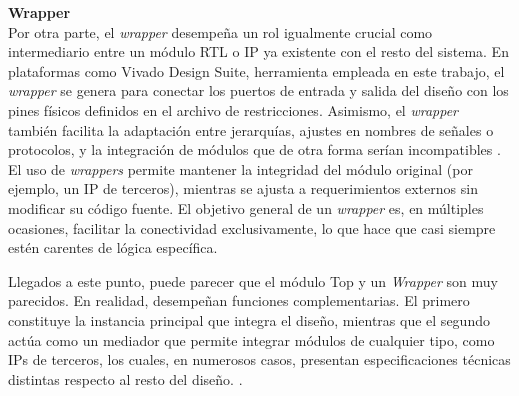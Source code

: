 \vspace{0.4em} %

\begin{adjustwidth}{1.5cm}{}
\textbf{Wrapper} \vspace{0.25cm} \\
Por otra parte, el \textit{wrapper} desempeña un rol igualmente crucial como intermediario entre un módulo RTL o IP ya existente con el resto del sistema. En plataformas como Vivado Design Suite, herramienta empleada en este trabajo, el \textit{wrapper} se genera para conectar los puertos de entrada y salida del diseño con los pines físicos definidos en el archivo de restricciones. Asimismo, el \textit{wrapper} también facilita la adaptación entre jerarquías, ajustes en nombres de señales o protocolos, y la integración de módulos que de otra forma serían incompatibles \cite{infoWrapper}. El uso de \textit{wrappers} permite mantener la integridad del módulo original (por ejemplo, un IP de terceros), mientras se ajusta a requerimientos externos sin modificar su código fuente. El objetivo general de un \textit{wrapper} es, en múltiples ocasiones, facilitar la conectividad exclusivamente, lo que hace que casi siempre estén carentes de lógica específica. 

Llegados a este punto, puede parecer que el módulo Top y un \textit{Wrapper} son muy parecidos. En realidad, desempeñan funciones complementarias. El primero constituye la instancia principal que integra el diseño, mientras que el segundo actúa como un mediador que permite integrar módulos de cualquier tipo, como IPs de terceros, los cuales, en numerosos casos, presentan especificaciones técnicas distintas respecto al resto del diseño. \cite{infoWrapper}.
\end{adjustwidth}

\vspace{0.4em} %


